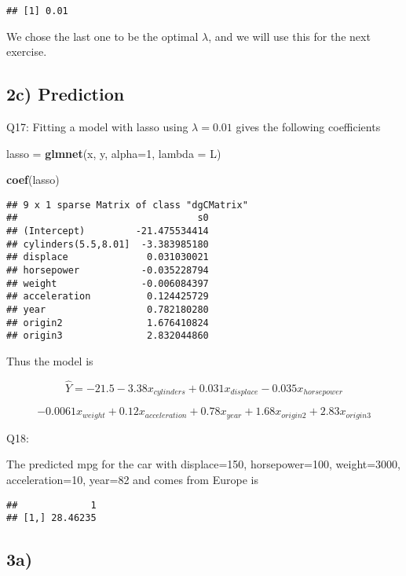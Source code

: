 \documentclass[]{article}
\newenvironment{Shaded}{\begin{snugshade}}{\end{snugshade}}
\newcommand{\KeywordTok}[1]{\textcolor[rgb]{0.13,0.29,0.53}{\textbf{#1}}}
\newcommand{\DataTypeTok}[1]{\textcolor[rgb]{0.13,0.29,0.53}{#1}}
\newcommand{\DecValTok}[1]{\textcolor[rgb]{0.00,0.00,0.81}{#1}}
\newcommand{\StringTok}[1]{\textcolor[rgb]{0.31,0.60,0.02}{#1}}
\newcommand{\NormalTok}[1]{#1}
\begin{document}
\begin{verbatim}
## [1] 0.01
\end{verbatim}

We chose the last one to be the optimal \(\lambda\), and we will use
this for the next exercise.

\subsection{2c) Prediction}\label{c-prediction}

Q17: Fitting a model with lasso using \(\lambda = 0.01\) gives the
following coefficients

\begin{Shaded}
\begin{Highlighting}[]
\NormalTok{lasso =}\StringTok{ }\KeywordTok{glmnet}\NormalTok{(x, y, }\DataTypeTok{alpha=}\DecValTok{1}\NormalTok{, }\DataTypeTok{lambda =}\NormalTok{ L)}

\KeywordTok{coef}\NormalTok{(lasso)}
\end{Highlighting}
\end{Shaded}

\begin{verbatim}
## 9 x 1 sparse Matrix of class "dgCMatrix"
##                                s0
## (Intercept)         -21.475534414
## cylinders(5.5,8.01]  -3.383985180
## displace              0.031030021
## horsepower           -0.035228794
## weight               -0.006084397
## acceleration          0.124425729
## year                  0.782180280
## origin2               1.676410824
## origin3               2.832044860
\end{verbatim}

Thus the model is

\[
\hat{Y} = -21.5 -3.38x_{cylinders} + 0.031x_{displace} - 0.035x_{horsepower}
\]

\[
-0.0061x_{weight}+0.12x_{acceleration} +0.78x_{year}+1.68x_{origin2}+2.83x_{origin3}
\]

Q18:

The predicted mpg for the car with displace=150, horsepower=100,
weight=3000, acceleration=10, year=82 and comes from Europe is

\begin{verbatim}
##             1
## [1,] 28.46235
\end{verbatim}

\subsection{3a)}\label{a-1}
\end{document}
